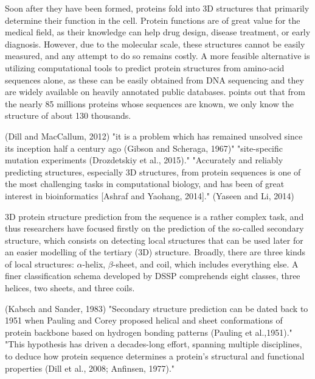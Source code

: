 
Soon after they have been formed, proteins fold into 3D structures that primarily determine their function in the cell. Protein functions are of great value for the medical field, as their knowledge can help drug design, disease treatment, or early diagnosis.
However, due to the molecular scale, these structures cannot be easily measured, and any attempt to do so remains costly. A more feasible alternative is utilizing computational tools to predict protein structures from amino-acid sequences alone, as these can be easily obtained from DNA sequencing and they are widely available on heavily annotated public databases. \cite{Hattori2017} points out that from the nearly 85 millions proteins whose sequences are known, we only know the structure of about 130 thousands.

(Dill and MacCallum, 2012)
"it is a problem which has remained unsolved since its inception half a century ago (Gibson and Scheraga, 1967)" \cite{Heffernan2017}
"site-specific mutation experiments (Drozdetskiy et al., 2015)." \cite{Fang2017}
"Accurately and reliably predicting structures, especially 3D structures, from protein sequences is one of the most challenging tasks in computational biology, and has been of great interest in bioinformatics [Ashraf and Yaohang, 2014]."\cite{Li2016}
(Yaseen and Li, 2014)

3D protein structure prediction from the sequence is a rather complex task, and thus researchers have focused firstly on the prediction of the so-called secondary structure, which consists on detecting local structures that can be used later for an easier modelling of the tertiary (3D) structure. Broadly, there are three kinds of local structures: $\alpha$-helix, $\beta$-sheet, and coil, which includes everything else. A finer classification schema developed by DSSP comprehends eight classes, three helices, two sheets, and three coils.

(Kabsch and Sander, 1983)
"Secondary structure prediction can be dated back to 1951 when Pauling and Corey proposed helical and sheet conformations of protein backbone based on hydrogen bonding patterns (Pauling et al.,1951)." \cite{Heffernan2017}
"This hypothesis has driven a decades-long effort, spanning multiple disciplines, to deduce how protein sequence determines a protein’s structural and functional properties (Dill et al., 2008; Anfinsen, 1977)." \cite{Busia2017}

